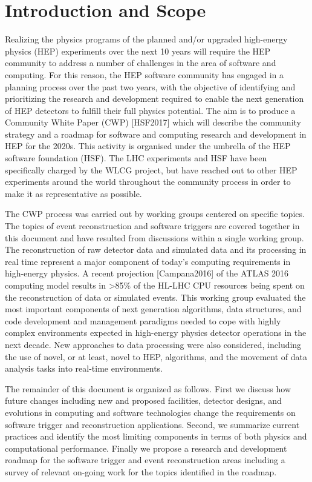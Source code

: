 \section{Introduction and Scope}

Realizing the physics programs of the planned and/or upgraded high-energy physics (HEP) experiments over the next 10 years will require the HEP community to address a number of challenges in the area of software and computing. For this reason, the HEP software community has engaged in a planning process over the past two years, with the objective of identifying and prioritizing the research and development required to enable the next generation of HEP detectors to fulfill their full physics potential. The aim is to produce a Community White Paper (CWP) [HSF2017] which will describe the community strategy and a roadmap for software and computing research and development in HEP for the 2020s. This activity is organised under the umbrella of the HEP software foundation (HSF). The LHC experiments and HSF have been specifically charged by the WLCG project, but have reached out to other HEP experiments around the world throughout the community process in order to make it as representative as possible.

The CWP process was carried out by working groups centered on specific topics. The topics of event reconstruction and software triggers are covered together in this document and have resulted from discussions within a single working group. The reconstruction of raw detector data and simulated data and its processing in real time represent a major component of today's computing requirements in high-energy physics. A recent projection [Campana2016] of the ATLAS 2016 computing model results in >85\% of the HL-LHC CPU resources being spent on the reconstruction of data or simulated events. This working group evaluated the most important components of next generation algorithms, data structures, and code development and management paradigms needed to cope with highly complex environments expected in high-energy physics detector operations in the next decade. New approaches to data processing were also considered, including the use of novel, or at least, novel to HEP, algorithms, and the movement of data analysis tasks into real-time environments. 

The remainder of this document is organized as follows. First we discuss how future changes including new and proposed facilities, detector designs, and evolutions in computing and software technologies change the requirements on software trigger and reconstruction applications. Second, we summarize current practices and identify the most limiting components in terms of both physics and computational performance. Finally we propose a research and development roadmap for the software trigger and event reconstruction areas including a survey of relevant on-going work for the topics identified in the roadmap. 

